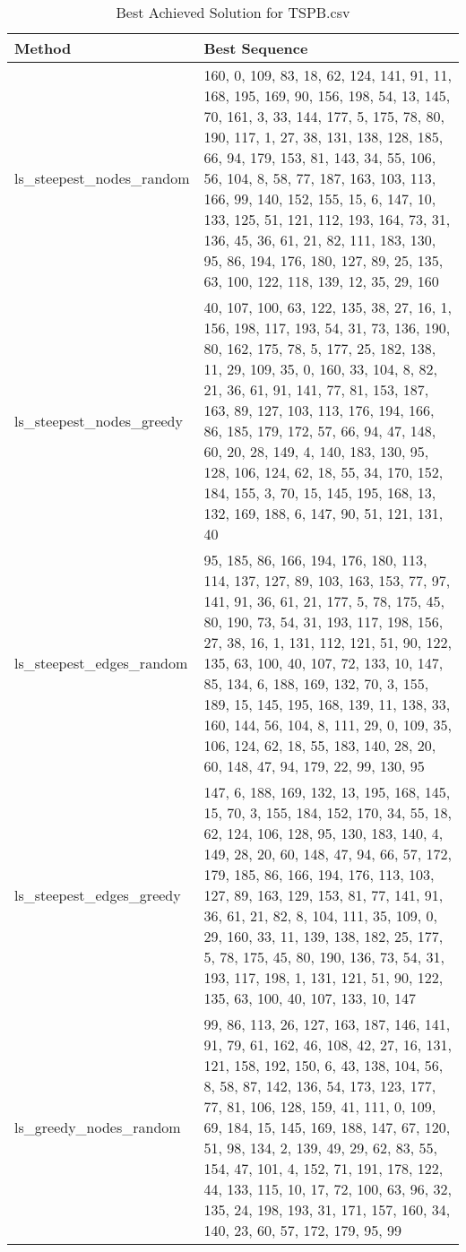 \begin{table}[H] %
\centering
\caption{Best Achieved Solution for TSPB.csv}
\label{tab:tsbp_best_sequence}
\begin{tabular}{|p{0.25\linewidth}|p{0.75\linewidth}|} %
\hline
\textbf{Method} & \textbf{Best Sequence} \\
\hline
ls\_steepest\_nodes\_random & 160, 0, 109, 83, 18, 62, 124, 141, 91, 11, 168, 195, 169, 90, 156, 198, 54, 13, 145, 70, 161, 3, 33, 144, 177, 5, 175, 78, 80, 190, 117, 1, 27, 38, 131, 138, 128, 185, 66, 94, 179, 153, 81, 143, 34, 55, 106, 56, 104, 8, 58, 77, 187, 163, 103, 113, 166, 99, 140, 152, 155, 15, 6, 147, 10, 133, 125, 51, 121, 112, 193, 164, 73, 31, 136, 45, 36, 61, 21, 82, 111, 183, 130, 95, 86, 194, 176, 180, 127, 89, 25, 135, 63, 100, 122, 118, 139, 12, 35, 29, 160 \\
\hline
ls\_steepest\_nodes\_greedy & 40, 107, 100, 63, 122, 135, 38, 27, 16, 1, 156, 198, 117, 193, 54, 31, 73, 136, 190, 80, 162, 175, 78, 5, 177, 25, 182, 138, 11, 29, 109, 35, 0, 160, 33, 104, 8, 82, 21, 36, 61, 91, 141, 77, 81, 153, 187, 163, 89, 127, 103, 113, 176, 194, 166, 86, 185, 179, 172, 57, 66, 94, 47, 148, 60, 20, 28, 149, 4, 140, 183, 130, 95, 128, 106, 124, 62, 18, 55, 34, 170, 152, 184, 155, 3, 70, 15, 145, 195, 168, 13, 132, 169, 188, 6, 147, 90, 51, 121, 131, 40 \\
\hline
ls\_steepest\_edges\_random & 95, 185, 86, 166, 194, 176, 180, 113, 114, 137, 127, 89, 103, 163, 153, 77, 97, 141, 91, 36, 61, 21, 177, 5, 78, 175, 45, 80, 190, 73, 54, 31, 193, 117, 198, 156, 27, 38, 16, 1, 131, 112, 121, 51, 90, 122, 135, 63, 100, 40, 107, 72, 133, 10, 147, 85, 134, 6, 188, 169, 132, 70, 3, 155, 189, 15, 145, 195, 168, 139, 11, 138, 33, 160, 144, 56, 104, 8, 111, 29, 0, 109, 35, 106, 124, 62, 18, 55, 183, 140, 28, 20, 60, 148, 47, 94, 179, 22, 99, 130, 95 \\
\hline
ls\_steepest\_edges\_greedy & 147, 6, 188, 169, 132, 13, 195, 168, 145, 15, 70, 3, 155, 184, 152, 170, 34, 55, 18, 62, 124, 106, 128, 95, 130, 183, 140, 4, 149, 28, 20, 60, 148, 47, 94, 66, 57, 172, 179, 185, 86, 166, 194, 176, 113, 103, 127, 89, 163, 129, 153, 81, 77, 141, 91, 36, 61, 21, 82, 8, 104, 111, 35, 109, 0, 29, 160, 33, 11, 139, 138, 182, 25, 177, 5, 78, 175, 45, 80, 190, 136, 73, 54, 31, 193, 117, 198, 1, 131, 121, 51, 90, 122, 135, 63, 100, 40, 107, 133, 10, 147 \\
\hline
ls\_greedy\_nodes\_random & 99, 86, 113, 26, 127, 163, 187, 146, 141, 91, 79, 61, 162, 46, 108, 42, 27, 16, 131, 121, 158, 192, 150, 6, 43, 138, 104, 56, 8, 58, 87, 142, 136, 54, 173, 123, 177, 77, 81, 106, 128, 159, 41, 111, 0, 109, 69, 184, 15, 145, 169, 188, 147, 67, 120, 51, 98, 134, 2, 139, 49, 29, 62, 83, 55, 154, 47, 101, 4, 152, 71, 191, 178, 122, 44, 133, 115, 10, 17, 72, 100, 63, 96, 32, 135, 24, 198, 193, 31, 171, 157, 160, 34, 140, 23, 60, 57, 172, 179, 95, 99 \\

\end{tabular}
\end{table}
